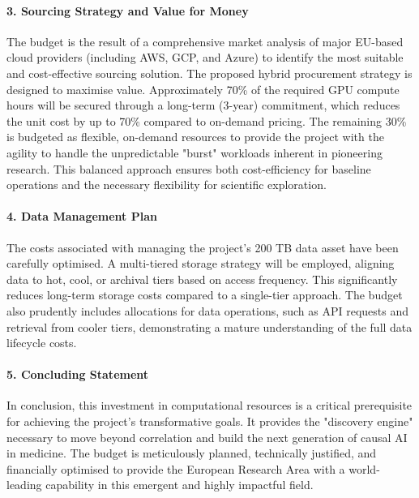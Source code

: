 \paragraph{3. Sourcing Strategy and Value for Money}
The budget is the result of a comprehensive market analysis of major EU-based cloud providers (including AWS, GCP, and Azure) to identify the most suitable and cost-effective sourcing solution. The proposed hybrid procurement strategy is designed to maximise value. Approximately 70\% of the required GPU compute hours will be secured through a long-term (3-year) commitment, which reduces the unit cost by up to 70\% compared to on-demand pricing. The remaining 30\% is budgeted as flexible, on-demand resources to provide the project with the agility to handle the unpredictable "burst" workloads inherent in pioneering research. This balanced approach ensures both cost-efficiency for baseline operations and the necessary flexibility for scientific exploration.

\paragraph{4. Data Management Plan}
The costs associated with managing the project's 200 TB data asset have been carefully optimised. A multi-tiered storage strategy will be employed, aligning data to hot, cool, or archival tiers based on access frequency. This significantly reduces long-term storage costs compared to a single-tier approach. The budget also prudently includes allocations for data operations, such as API requests and retrieval from cooler tiers, demonstrating a mature understanding of the full data lifecycle costs.

\paragraph{5. Concluding Statement}
In conclusion, this investment in computational resources is a critical prerequisite for achieving the project's transformative goals. It provides the "discovery engine" necessary to move beyond correlation and build the next generation of causal AI in medicine. The budget is meticulously planned, technically justified, and financially optimised to provide the European Research Area with a world-leading capability in this emergent and highly impactful field.

